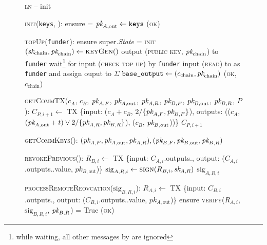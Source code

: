 \begin{figure}[H]
  \begin{processbox}{\textsc{ln} -- init}
    \begin{algorithmic}[1]
      \State \textsc{init}(\texttt{keys}, \dave):
      \Indent
        \State ensure \dave = \alice
        \State $\textit{pk}_{A, \mathrm{out}} \gets \texttt{keys}$
        \State \Return (\textsc{ok})
      \EndIndent
      \Statex

      \State \textsc{topUp}(\texttt{funder}):
      \Indent
        \State ensure super.\textit{State} = \textsc{init}
        \State $(\textit{sk}_{\mathrm{chain}}, \textit{pk}_{\mathrm{chain}}) \gets
        \textsc{keyGen}()$
        \State output (\textsc{public key}, $\textit{pk}_{\mathrm{chain}}$) to
        \texttt{funder}
          \State wait\footnote{while waiting, all other messages by \dave are
          ignored} for input (\textsc{check top up}) by \texttt{funder}
          \State input (\textsc{read}) to \ledger as \texttt{funder} and assign
          ouput to $\Sigma$
        \EndWhile
        \State $\texttt{base\_output} \gets (c_{\mathrm{chain}},
        \textit{pk}_{\mathrm{chain}})$
        \State \Return (\textsc{ok}, $c_{\mathrm{chain}}$)
      \EndIndent
      \Statex

      \State {}
      \State \textsc{getCommTX}($c_A$, $c_B$, $\textit{pk}_{A, F}$, $\textit{pk}_{A,
      \mathrm{out}}$, $\textit{pk}_{A, R}$, $\textit{pk}_{B, F}$, $\textit{pk}_{B, \mathrm{out}}$, $\textit{pk}_{B,
      R}$, $P$):
      \Indent
        \State $C_{P, i+1} \gets$ TX \{input: ($c_A + c_B$, $2/\{\textit{pk}_{A, F},
        \textit{pk}_{B, F}\}$), outputs: (($c_A$, $(\textit{pk}_{A, \mathrm{out}} + t) \vee
        2/\{\textit{pk}_{A, R}, \textit{pk}_{B, R}\}$), ($c_B$, $\textit{pk}_{B, \mathrm{out}}$))\}
        \State \Return $C_{P, i+1}$
      \EndIndent
      \Statex

      \State {}
      \State \textsc{getCommKeys}():
      \Indent
        \State \Return $(\textit{pk}_{A, F}, \textit{pk}_{A, \mathrm{out}}, \textit{pk}_{A, R}), (\textit{pk}_{B,
        F}, \textit{pk}_{B, \mathrm{out}}, \textit{pk}_{B, R})$
      \EndIndent

      \State {}
      \State \textsc{revokePrevious}():
      \Indent
        \State $R_{B, i} \gets$ TX \{input: $C_{A, i}$.outputs.\alice, output:
        ($C_{A, i}$.outputs.\alice.value, $pk_{B, \mathrm{out}}$)\}
        \State $\mathrm{sig}_{A, R, i} \gets \textsc{sign}(R_{B, i}, \textit{sk}_{A, R})$
        \State \Return $\mathrm{sig}_{A, R, i}$
      \EndIndent

      \State {}
      \State \textsc{processRemoteReovcation}($\mathrm{sig}_{B, R, i}$):
      \Indent
        \State $R_{A, i} \gets$ TX \{input: $C_{B, i}$.outputs.\bob, output:
        ($C_{B, i}$.outputs.\bob.value, $pk_{A, \mathrm{out}}$)\}
        \State ensure \textsc{verify}($R_{A, i}$, $\mathrm{sig}_{B, R, i}$,
        $\textit{pk}_{B, R}$) = True
        \State \Return (\textsc{ok})
      \EndIndent
    \end{algorithmic}
  \end{processbox}
  \caption{}
  \label{code:ln:init}
\end{figure}

